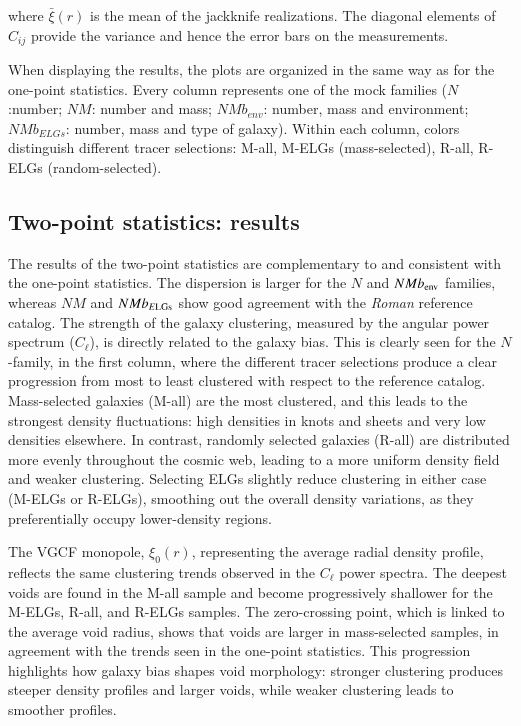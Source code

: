 \documentclass[]{aa} %
\begin{document}
where $\bar{\xi}(r)$ is the mean of the jackknife realizations. The diagonal elements of $C_{ij}$ provide the variance and hence the error bars on the measurements.

When displaying the results, the plots are organized in the same way as for the one-point statistics. Every column represents one of the mock families ($N$:number; $NM$: number and mass; $NMb_{env}$: number, mass and environment; $NMb_{ELGs}$: number, mass and type of galaxy). Within each column, colors distinguish different tracer selections: M-all, M-ELGs (mass-selected), R-all, R-ELGs (random-selected).

\subsection{Two-point statistics: results}
\label{sec:void_gal_results}

The results of the two-point statistics are complementary to and consistent with the one-point statistics. The dispersion is larger for the $N$ and $NMb_{\rm env}$ families, whereas $NM$ and $NMb_{E\rm LGs}$ show good agreement with the \emph{Roman} reference catalog. The strength of the galaxy clustering, measured by the angular power spectrum ($C_\ell$), is directly related to the galaxy bias. This is clearly seen for the $N$-family, in the first column, where the different tracer selections produce a clear progression from most to least clustered with respect to the reference catalog. Mass-selected galaxies (M-all) are the most clustered, and this leads to the strongest density fluctuations: high densities in knots and sheets and very low densities elsewhere. In contrast, randomly selected galaxies (R-all) are distributed more evenly throughout the cosmic web, leading to a more uniform density field and weaker clustering. Selecting ELGs slightly reduce clustering in either case (M-ELGs or R-ELGs), smoothing out the overall density variations, as they preferentially occupy lower-density regions.

The VGCF monopole, $\xi_0(r)$, representing the average radial density profile, reflects the same clustering trends observed in the $C_\ell$ power spectra. The deepest voids are found in the M-all sample and become progressively shallower for the M-ELGs, R-all, and R-ELGs samples. The zero-crossing point, which is linked to the average void radius, shows that voids are larger in mass-selected samples, in agreement with the trends seen in the one-point statistics. This progression highlights how galaxy bias shapes void morphology: stronger clustering produces steeper density profiles and larger voids, while weaker clustering leads to smoother profiles.
\end{document}
